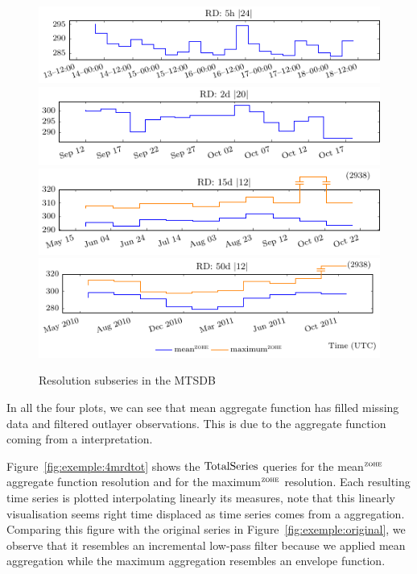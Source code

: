 \begin{figure}[tp]
  \centering
  \includegraphics{fig_exemple_4mrd1.pdf}
  \includegraphics{fig_exemple_4mrd2.pdf}
  \includegraphics{fig_exemple_4mrd3.pdf}
  \includegraphics{fig_exemple_4mrd4.pdf}
  \caption{Resolution subseries in the MTSDB}
  \label{fig:exemple:4mrd}
\end{figure}

In all the four plots, we can see that mean aggregate function has
filled missing data and filtered outlayer observations. This is due
to the aggregate function coming from a \zohe{} interpretation.

Figure~\ref{fig:exemple:4mrdtot} shows the $\operatorname{TotalSeries}$
queries for the mean$^{\zohe}$ aggregate function resolution and for
the maximum$^{\zohe}$ resolution.  Each resulting time series is
plotted interpolating linearly its measures, note that this linearly
visualisation seems right time displaced as time series comes from a
\zohe{} aggregation.  Comparing this figure with the original series
in Figure~\ref{fig:exemple:original}, we observe that it resembles an
incremental low-pass filter because we applied mean aggregation while
the maximum aggregation resembles an envelope function.

